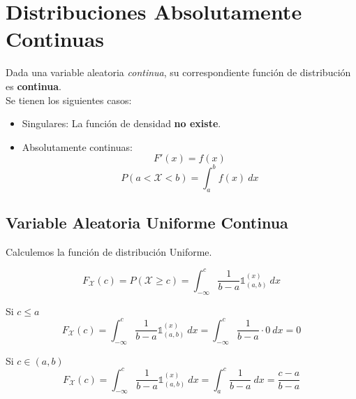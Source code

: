 \section{Distribuciones Absolutamente Continuas}
Dada una variable aleatoria \textit{continua}, su correspondiente función de distribución es \textbf{continua}.\\
Se tienen los siguientes casos:
\begin{itemize}
  \item Singulares: La función de densidad \textbf{no existe}. 
  \item Absolutamente continuas: \[F'(x) = f(x)\] \[P(a < \mathcal X < b) = \int_a^b f(x)~dx\]
\end{itemize}

\subsection{Variable Aleatoria Uniforme Continua}


Calculemos la función de distribución Uniforme.

\[F_{\mathcal X}(c) = P(\mathcal X \ge c) = \int_{-\infty}^c \frac1{b-a} \mathbb 1_{(a,b)}^{(x)}~dx\]

Si $c \le a$
\[F_{\mathcal X}(c) = \int_{-\infty}^c \frac1{b-a} \mathbb 1_{(a,b)}^{(x)}~dx = \int_{-\infty}^c \frac1{b-a} \cdot 0~dx = 0\]

Si $c \in (a,b)$
\[F_{\mathcal X}(c) = \int_{-\infty}^c \frac1{b-a} \mathbb 1_{(a,b)}^{(x)}~dx = \int_{a}^c \frac1{b-a}~dx = \frac{c-a}{b-a} \]

